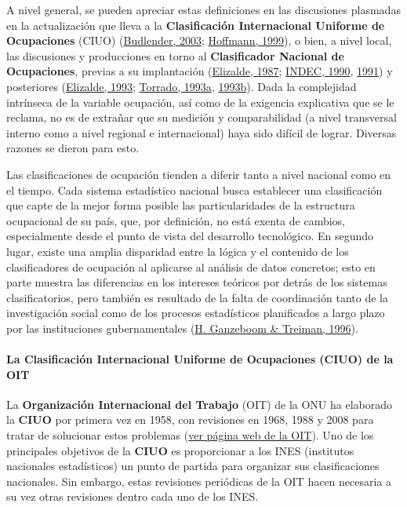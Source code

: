 \documentclass[
]{article}
\begin{document}
A nivel general, se pueden apreciar estas definiciones en las discusiones plasmadas en la actualización que lleva a la \textbf{Clasificación Internacional Uniforme de Ocupaciones} (CIUO) (\protect\hyperlink{ref-Budlender2003}{Budlender, 2003}; \protect\hyperlink{ref-Hoffmann1999}{Hoffmann, 1999}), o bien, a nivel local, las discusiones y producciones en torno al \textbf{Clasificador Nacional de Ocupaciones}, previas a su implantación (\protect\hyperlink{ref-Elizalde1987}{Elizalde, 1987}; \protect\hyperlink{ref-INDEC1990}{INDEC, 1990}, \protect\hyperlink{ref-INDEC1991}{1991}) y posteriores (\protect\hyperlink{ref-Elizalde1993}{Elizalde, 1993}; \protect\hyperlink{ref-Torrado1993}{Torrado, 1993a}, \protect\hyperlink{ref-Torrado1993a}{1993b}). Dada la complejidad intrínseca de la variable ocupación, así como de la exigencia explicativa que se le reclama, no es de extrañar que su medición y comparabilidad (a nivel transversal interno como a nivel regional e internacional) haya sido difícil de lograr. Diversas razones se dieron para esto.

Las clasificaciones de ocupación tienden a diferir tanto a nivel nacional como en el tiempo. Cada sistema estadístico nacional busca establecer una clasificación que capte de la mejor forma posible las particularidades de la estructura ocupacional de su país, que, por definición, no está exenta de cambios, especialmente desde el punto de vista del desarrollo tecnológico. En segundo lugar, existe una amplia disparidad entre la lógica y el contenido de los clasificadores de ocupación al aplicarse al análisis de datos concretos; esto en parte muestra las diferencias en los intereses teóricos por detrás de los sistemas clasificatorios, pero también es resultado de la falta de coordinación tanto de la investigación social como de los procesos estadísticos planificados a largo plazo por las instituciones gubernamentales (\protect\hyperlink{ref-Ganzeboom1996}{H. Ganzeboom \& Treiman, 1996}).

\hypertarget{la-clasificaciuxf3n-internacional-uniforme-de-ocupaciones-ciuo-de-la-oit}{%
\paragraph{La Clasificación Internacional Uniforme de Ocupaciones (CIUO) de la OIT}\label{la-clasificaciuxf3n-internacional-uniforme-de-ocupaciones-ciuo-de-la-oit}}

La \textbf{Organización Internacional del Trabajo} (OIT) de la ONU ha elaborado la \textbf{CIUO} por primera vez en 1958, con revisiones en 1968, 1988 y 2008 para tratar de solucionar estos problemas (\href{https://www.ilo.org/public/spanish/bureau/stat/isco/}{ver página web de la OIT}). Uno de los principales objetivos de la \textbf{CIUO} es proporcionar a los INES (institutos nacionales estadísticos) un punto de partida para organizar sus clasificaciones nacionales. Sin embargo, estas revisiones periódicas de la OIT hacen necesaria a su vez otras revisiones dentro cada uno de los INES.
\end{document}
